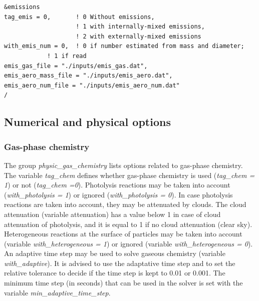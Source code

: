 \documentclass[a4paper,11pt]{article}
\begin{document}
\begin{verbatim}
&emissions
tag_emis = 0,       ! 0 Without emissions, 
                    ! 1 with internally-mixed emissions, 
                    ! 2 with externally-mixed emissions  
with_emis_num = 0,  ! 0 if number estimated from mass and diameter; 
		    ! 1 if read
emis_gas_file = "./inputs/emis_gas.dat",
emis_aero_mass_file = "./inputs/emis_aero.dat", 
emis_aero_num_file = "./inputs/emis_aero_num.dat" 
/
\end{verbatim}


\subsection{Numerical and physical options}

\subsubsection{Gas-phase chemistry}

The group {\textit{physic\_gas\_chemistry}} lists options related to gas-phase chemistry. 
The variable {\textit{tag\_chem}} defines whether gas-phase chemistry is used ({\textit{tag\_chem = 1}}) or not ({\textit{tag\_chem =0}}). 
Photolysis reactions may be taken into account ({\textit{with\_photolysis = 1}}) or ignored ({\textit{with\_photolysis = 0}}). In case photolysis reactions are taken into account, they may be attenuated by clouds. The cloud attenuation (variable attenuation) has a value below 1 in case of cloud attenuation of photolysis, and it is equal to 1 if no cloud attenuation (clear sky).
Heterogeneous reactions at the surface of particles may be taken into account (variable {\textit{with\_heterogeneous = 1}}) or ignored (variable {\textit{with\_heterogeneous = 0}}). An adaptive time step may be used to solve gaseous chemistry (variable {\textit{with\_adaptive}}). It is advised to use the adaptative time step and to set the relative tolerance to decide if the time step is kept to 0.01 or 0.001. The minimum time step (in seconds) that can be used in the solver is set with the variable {\textit{min\_adaptive\_time\_step}}.
\end{document}
